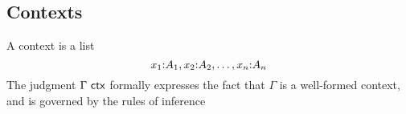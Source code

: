 \documentclass[hott-all.tex]{subfiles}
\begin{document}
\subsection{Contexts}
%
A context is a list
\begin{equation*}
  x_1 \mathord{:} A_1, x_2 \mathord{:} A_2, \ldots, x_n \mathord{:} A_n
\end{equation*}
%
%
The judgment $\Gamma\ \mathsf{ctx}$ formally expresses the fact that $\Gamma$ is a well-formed context, and is governed by the rules of inference
%
%
%
\end{document}
